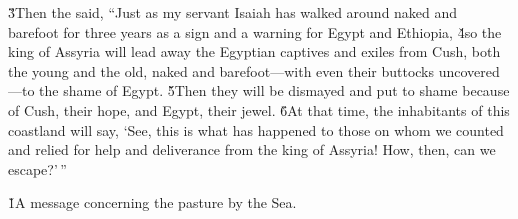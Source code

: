 \v{3}Then the  said, ``Just as my servant Isaiah has walked around naked and barefoot for three years as a sign and a warning for Egypt and Ethiopia, \v{4}so the king of Assyria will lead away the Egyptian captives and exiles from Cush, both the young and the old, naked and barefoot---with even their buttocks uncovered---to the shame of Egypt. \v{5}Then they will be dismayed and put to shame because of Cush, their hope, and Egypt, their jewel. \v{6}At that time, the inhabitants of this coastland will say, `See, this is what has happened to those on whom we counted and relied for help and deliverance from the king of Assyria! How, then, can we escape?'\,''

\v{1}A message concerning the pasture by the Sea.

